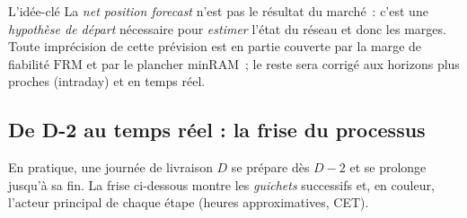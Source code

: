 \documentclass[11pt,a4paper]{article}
\newcommand{\FRM}{\mathrm{FRM}}
\begin{document}
\begin{rembox}{L'idée-clé}
La \emph{net position forecast} n'est pas le résultat du marché~: c'est une
\emph{hypothèse de départ} nécessaire pour \emph{estimer} l'état du réseau et
donc les marges. Toute imprécision de cette prévision est en partie couverte
par la marge de fiabilité $\FRM$ et par le plancher minRAM~; le reste sera
corrigé aux horizons plus proches (intraday) et en temps réel.
\end{rembox}

\subsection{De D-2 au temps réel : la frise du processus}
\label{sec:frise}

En pratique, une journée de livraison $D$ se prépare dès $D\!-\!2$ et se
prolonge jusqu'à sa fin. La frise ci-dessous montre les \emph{guichets}
successifs et, en couleur, l'acteur principal de chaque étape (heures
approximatives, CET).

\begin{center}
\end{center}
\end{document}
